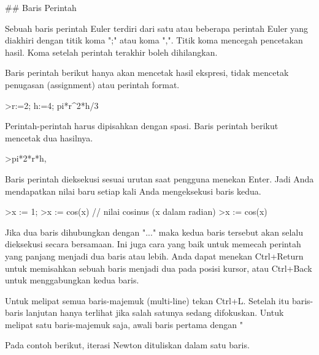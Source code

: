 \documentclass[a4paper,10pt]{article}
\begin{document}
\begin{eulernotebook}
\begin{euleroutput}
  ## Baris Perintah
  
  Sebuah baris perintah Euler terdiri dari satu atau beberapa perintah Euler yang diakhiri dengan titik koma ";" atau koma ",". Titik koma mencegah pencetakan hasil. Koma setelah perintah terakhir boleh dihilangkan.
  
  Baris perintah berikut hanya akan mencetak hasil ekspresi, tidak mencetak penugasan (assignment) atau perintah format.
  
\end{euleroutput}
\begin{eulerprompt}
>r:=2; h:=4; pi*r^2*h/3
\end{eulerprompt}
\begin{euleroutput}
  
  Perintah-perintah harus dipisahkan dengan spasi. Baris perintah berikut mencetak dua hasilnya.
  
\end{euleroutput}
\begin{eulerprompt}
>pi*2*r*h, %
\end{eulerprompt}
\begin{euleroutput}
  
  Baris perintah dieksekusi sesuai urutan saat pengguna menekan Enter. Jadi Anda mendapatkan nilai baru setiap kali Anda mengeksekusi baris kedua.
  
\end{euleroutput}
\begin{eulerprompt}
>x := 1;
>x := cos(x) // nilai cosinus (x dalam radian)
>x := cos(x)
\end{eulerprompt}
\begin{euleroutput}
  
  Jika dua baris dihubungkan dengan "..." maka kedua baris tersebut akan selalu dieksekusi secara bersamaan. Ini juga cara yang baik untuk memecah perintah yang panjang menjadi dua baris atau lebih. Anda dapat menekan Ctrl+Return untuk memisahkan sebuah baris menjadi dua pada posisi kursor, atau Ctrl+Back untuk menggabungkan kedua baris.
  
  Untuk melipat semua baris-majemuk (multi-line) tekan Ctrl+L. Setelah itu baris-baris lanjutan hanya terlihat jika salah satunya sedang difokuskan. Untuk melipat satu baris-majemuk saja, awali baris pertama dengan "%
  
  Pada contoh berikut, iterasi Newton dituliskan dalam satu baris.
  

\end{euleroutput}
\end{eulernotebook}
\end{document}
